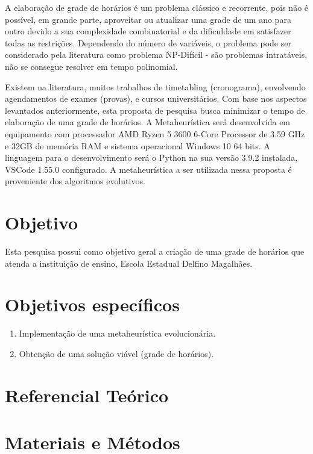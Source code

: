 \documentclass[
	12pt,				%
	openright,			%
	oneside,			%
	a4paper,			%
	english,			%
	french,				%
	spanish,			%
	brazil				%
	]{unimontes-ppgmsc-abntex2}
\begin{document}
A elaboração de grade de horários é um problema clássico e recorrente, pois não é possível, em grande parte, aproveitar ou atualizar uma grade de um ano para outro devido a sua complexidade combinatorial e da dificuldade em satisfazer todas as restrições. Dependendo do número de variáveis, o problema pode ser considerado pela literatura como problema NP-Difícil - são problemas intratáveis, não se consegue resolver em tempo polinomial.

Existem na literatura, muitos trabalhos de timetabling (cronograma), envolvendo agendamentos de exames (provas), e cursos universitários. Com base nos aspectos levantados anteriormente, esta proposta de pesquisa busca minimizar o tempo de elaboração de uma grade de horários. A Metaheurística será desenvolvida em equipamento com processador AMD Ryzen 5 3600 6-Core Processor de 3.59 GHz e 32GB de memória RAM e sistema operacional Windows 10 64 bits. A linguagem para o desenvolvimento será o Python na sua versão 3.9.2 instalada, VSCode 1.55.0 configurado. A metaheurística a ser utilizada nessa proposta é proveniente dos algoritmos evolutivos.

\section{Objetivo}

Esta pesquisa possui como objetivo geral a criação de uma grade de horários que atenda a instituição de ensino, Escola Estadual Delfino Magalhães.

\section{Objetivos específicos}

\begin{enumerate}
\item Implementação de uma metaheurística evolucionária.
\item Obtenção de uma solução viável (grade de horários).
\end{enumerate}

\section{Referencial Teórico}



\section{Materiais e Métodos}
\label{sec:metodologia}
\end{document}
